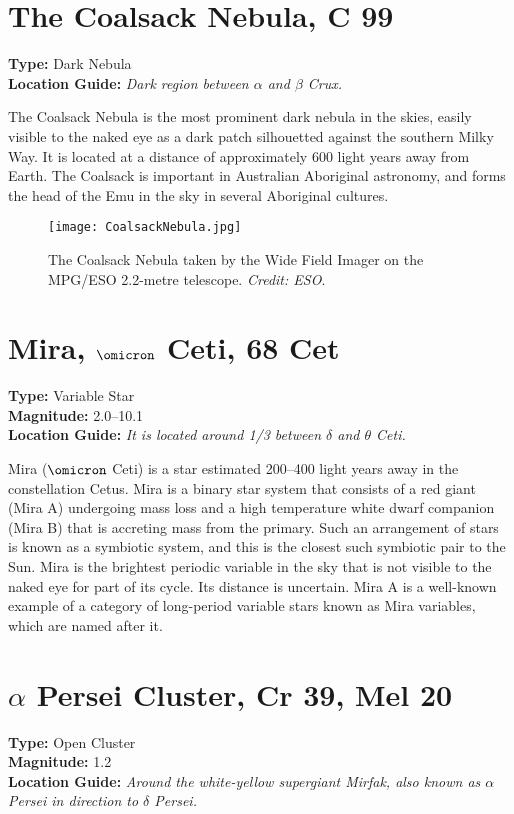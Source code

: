 \section{The Coalsack Nebula, C 99}
\textbf{Type:} Dark Nebula \\
\textbf{Location Guide:} \textit{Dark region between $\alpha$ and $\beta$ Crux.}

The Coalsack Nebula is the most prominent dark nebula in the skies,
easily visible to the naked eye as a dark patch silhouetted against
the southern Milky Way. It is located at a distance of approximately
600 light years away from Earth. The Coalsack is important in
Australian Aboriginal astronomy, and forms the head of the Emu in the
sky in several Aboriginal cultures.

\begin{figure}[ht]
\centering
\texttt{[image: CoalsackNebula.jpg]}
\caption{The Coalsack Nebula taken by the Wide Field Imager on the MPG/ESO 2.2-metre telescope. \emph{Credit: ESO}.}
\label{fig:CoalsackNebula}
\end{figure}

\section{Mira, \texorpdfstring{$\omicron$}{omicron} Ceti, 68 Cet}
\textbf{Type:} Variable Star \\
\textbf{Magnitude:} 2.0--10.1 \\ 
\textbf{Location Guide:} \textit{It is located around 1/3 between $\delta$ and $\theta$ Ceti.}

Mira ($\omicron$ Ceti) is a star estimated 200--400 light years away
in the constellation Cetus. Mira is a binary star system that consists
of a red giant (Mira A) undergoing mass loss and a high temperature
white dwarf companion (Mira B) that is accreting mass from the
primary. Such an arrangement of stars is known as a symbiotic system,
and this is the closest such symbiotic pair to the Sun. Mira is the
brightest periodic variable in the sky that is not visible to the
naked eye for part of its cycle. Its distance is uncertain. Mira A is
a well-known example of a category of long-period variable stars known as Mira
variables, which are named after it.

\section{\texorpdfstring{$\alpha$}{alpha} Persei Cluster, Cr 39, Mel 20}
\textbf{Type:} Open Cluster \\
\textbf{Magnitude:} 1.2 \\ 
\textbf{Location Guide:} \textit{Around the white-yellow supergiant Mirfak, also known as $\alpha$ Persei in direction to $\delta$ Persei.}


